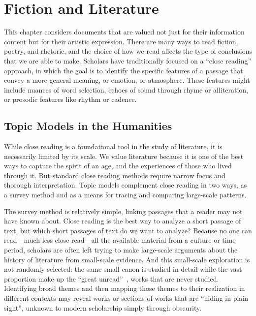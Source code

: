 
\chapter{Fiction and Literature}

\label{ch:fiction}

This chapter considers documents that are valued not just for their information content but for their artistic expression.
There are many ways to read fiction, poetry, and rhetoric, and the choice of how we read affects the type of conclusions that we are able to make.
Scholars have traditionally focused on a ``close reading'' approach, in which the goal is to identify the specific features of a passage that convey a more general meaning, or emotion, or atmosphere.
These features might include nuances of word  selection, echoes of sound through rhyme or alliteration, or prosodic features like rhythm or cadence.

\section{Topic Models in the Humanities}

While close reading is a foundational tool in the study of literature, it is necessarily limited by its scale.
We value literature because it is one of the best ways to capture the spirit of an age, and the experiences of those who lived through it. But standard close reading methods require narrow focus and thorough interpretation.
Topic models complement close reading in two ways, as a survey method and as a means for tracing and comparing large-scale patterns.

The survey method is relatively simple, linking passages that a reader may not have known about.
Close reading is the best way to analyze a short passage of text, but which short passages of text do we want to analyze?
Because no one can read---much less close read---all the available material from a culture or time period, scholars are often left trying to make large-scale arguments about the history of literature from small-scale evidence. And this small-scale exploration is not randomly selected: the same small canon is studied in detail while the vast proportion make up the ``great unread''~\citep{moretti-00}, works that are never studied.
Identifying broad themes and then mapping those themes to their realization in different contexts may reveal works or sections of works that are ``hiding in plain sight'', unknown to modern scholarship simply through obscurity.

